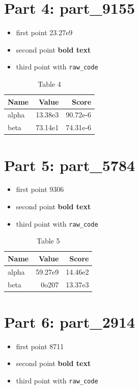 \documentclass[11pt,a4paper]{article}
\begin{document}
\section{Part 4: part_9155}

\begin{itemize}
  \item first point 23.27e9
  \item second point \textbf{bold text}
  \item third point with \verb|raw_code|
\end{itemize}

\begin{table}[h]
  \centering
  \begin{tabular}{lrr}
    \hline
    Name & Value & Score \\ \hline
    alpha & 13.38e3 & 90.72e-6 \\
    beta & 73.14e1 & 74.31e-6 \\ \hline
  \end{tabular}
  \caption{Table 4}
\end{table}

\section{Part 5: part_5784}

\begin{itemize}
  \item first point 9306
  \item second point \textbf{bold text}
  \item third point with \verb|raw_code|
\end{itemize}

\begin{table}[h]
  \centering
  \begin{tabular}{lrr}
    \hline
    Name & Value & Score \\ \hline
    alpha & 59.27e9 & 14.46e2 \\
    beta & 0o207 & 13.37e3 \\ \hline
  \end{tabular}
  \caption{Table 5}
\end{table}

\section{Part 6: part_2914}

\begin{itemize}
  \item first point 8711
  \item second point \textbf{bold text}
  \item third point with \verb|raw_code|
\end{itemize}
\end{document}
